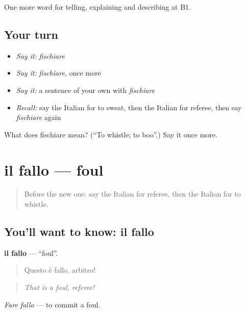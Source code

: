 \begin{grammarlens}[title={What you've built}]
One more word for telling, explaining and describing at B1.
\end{grammarlens}

\subsection*{Your turn}
\begin{itemize}
\raggedright
  \item \emph{Say it:} \emph{fischiare}
  \item \emph{Say it:} \emph{fischiare}, once more
  \item \emph{Say it:} a sentence of your own with \emph{fischiare}
  \item \emph{Recall:} say the Italian for to sweat, then the Italian for referee, then say \emph{fischiare} again
\end{itemize}

\begin{tcolorbox}[breakable,colback=teal!4,colframe=teal!35!black,title={Before you move on}]
What does fischiare mean? (\textquotedblleft{}To whistle; to boo\textquotedblright{}.) Say it once more.
\end{tcolorbox}
\section[il fallo]{il fallo — foul}

\label{lesson:IT-C509-fallo}



\begin{quote}
Before the new one: say the Italian for referee, then the Italian for to whistle.
\end{quote}

\subsection*{You'll want to know: il fallo}
\textbf{il fallo} — \textquotedblleft{}foul\textquotedblright{}.

\begin{quote}
Questo è fallo, arbitro!
\end{quote}

\begin{quote}
\emph{That is a foul, referee!}
\end{quote}

\emph{Fare fallo} — to commit a foul.

